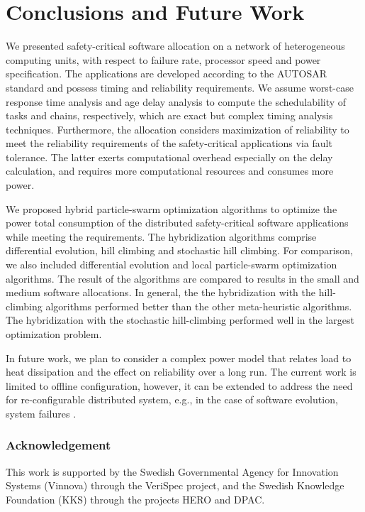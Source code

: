 \section{Conclusions and Future Work}\label{sec_conclusion}
We presented safety-critical software allocation on a network of heterogeneous computing units, with respect to failure rate, processor speed and power specification. The applications are developed according to the AUTOSAR standard and possess timing and reliability requirements. We assume worst-case response time analysis and age delay analysis to compute the schedulability of tasks and chains, respectively, which are exact but complex timing analysis techniques. Furthermore, the allocation considers maximization of reliability to meet the reliability requirements of the safety-critical applications via fault tolerance. The latter exerts computational overhead especially on the delay calculation, and requires more computational resources and consumes more power.

We proposed hybrid particle-swarm optimization algorithms to optimize the power total consumption of the distributed safety-critical software applications while meeting the requirements. The hybridization algorithms comprise differential evolution, hill climbing and stochastic hill climbing. For comparison, we also included differential evolution and local particle-swarm optimization algorithms. The result of the algorithms are compared to \ilp{} results in the small and medium software allocations. In general, the the hybridization with the hill-climbing algorithms performed better than the other meta-heuristic algorithms. The hybridization with the stochastic hill-climbing performed well in the largest optimization problem.

In future work, we plan to consider a complex power model that relates load to heat dissipation and the effect on reliability over a long run. The current work is limited to offline configuration, however, it can be extended to address the need for re-configurable distributed system, e.g., in the case of software evolution, system failures .

\subsubsection*{Acknowledgement}
This work is supported by the Swedish Governmental Agency for Innovation Systems (Vinnova) through the VeriSpec project, and the Swedish Knowledge Foundation (KKS) through the projects HERO and DPAC.

